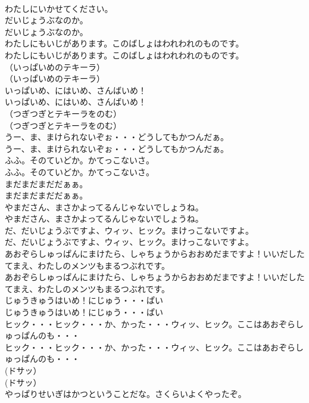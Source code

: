 \documentclass[8pt]{extreport}
\begin{document}
\begin{CJK}{UTF8}{min}
\\	わたしにいかせてください。
\\	だいじょうぶなのか。
\\	だいじょうぶなのか。
\\	わたしにもいじがあります。このばしょはわれわれのものです。
\\	わたしにもいじがあります。このばしょはわれわれのものです。
\\	（いっぱいめのテキーラ）
\\	（いっぱいめのテキーラ）
\\	いっぱいめ、にはいめ、さんばいめ！
\\	いっぱいめ、にはいめ、さんばいめ！
\\	（つぎつぎとテキーラをのむ）
\\	（つぎつぎとテキーラをのむ）
\\	うー、ま、まけられないぞぉ・・・どうしてもかつんだぁ。
\\	うー、ま、まけられないぞぉ・・・どうしてもかつんだぁ。
\\	ふふ。そのていどか。かてっこないさ。
\\	ふふ。そのていどか。かてっこないさ。
\\	まだまだまだだぁぁ。
\\	まだまだまだだぁぁ。
\\	やまださん、まさかよってるんじゃないでしょうね。
\\	やまださん、まさかよってるんじゃないでしょうね。
\\	だ、だいじょうぶですよ、ウィッ、ヒック。まけっこないですよ。
\\	だ、だいじょうぶですよ、ウィッ、ヒック。まけっこないですよ。
\\	あおぞらしゅっぱんにまけたら、しゃちょうからおおめだまですよ！いいだしたてまえ、わたしのメンツもまるつぶれです。
\\	あおぞらしゅっぱんにまけたら、しゃちょうからおおめだまですよ！いいだしたてまえ、わたしのメンツもまるつぶれです。
\\	じゅうきゅうはいめ！にじゅう・・・ぱい
\\	じゅうきゅうはいめ！にじゅう・・・ぱい
\\	ヒック・・・ヒック・・・か、かった・・・ウィッ、ヒック。ここはあおぞらしゅっぱんのも・・・
\\	ヒック・・・ヒック・・・か、かった・・・ウィッ、ヒック。ここはあおぞらしゅっぱんのも・・・
\\	(ドサッ）
\\	(ドサッ）
\\	やっぱりせいぎはかつということだな。さくらいよくやったぞ。

\end{CJK}
\end{document}
